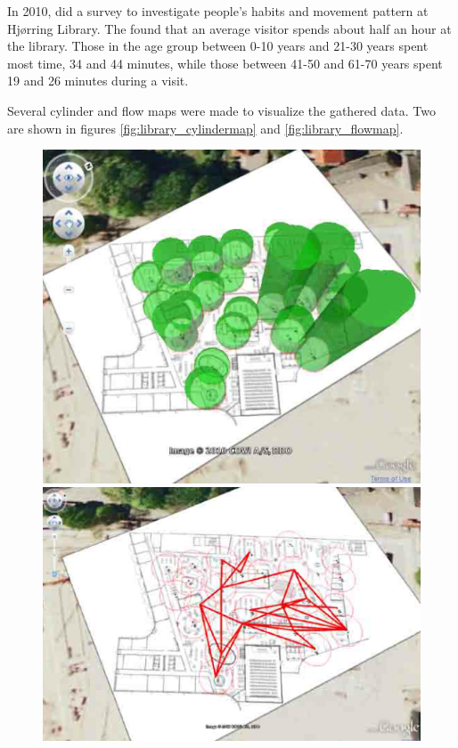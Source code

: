 In 2010, \citep{hjoerring_study} did a survey to investigate people's habits and movement pattern at Hj{\o}rring Library. The found that an average visitor spends about half an hour at the library. Those in the age group between 0-10 years and 21-30 years spent most time, 34 and 44 minutes, while those between 41-50 and 61-70 years spent 19 and 26 minutes during a visit.

Several cylinder and flow maps were made to visualize the gathered data. Two are shown in figures \ref{fig:library_cylindermap} and \ref{fig:library_flowmap}.

\begin{figure}[htbp] \centering
\begin{minipage}[b]{0.45\textwidth} \centering
\includegraphics[width=1.00\textwidth]{Pictures/HjoerringLibrary/library_cylinder_diagram_24Nov.png} %
\end{minipage} \hfill
\begin{minipage}[b]{0.45\textwidth} \centering
\includegraphics[width=1.00\textwidth]{Pictures/HjoerringLibrary/library_flow_Nov21.png} %

\end{minipage}
\end{figure}
